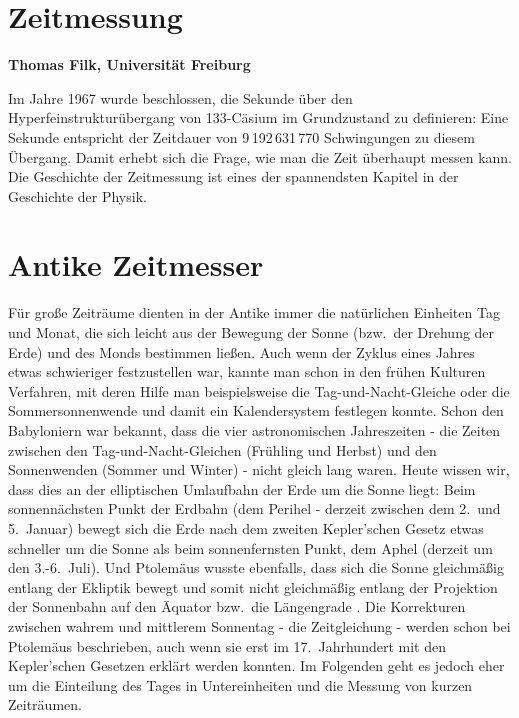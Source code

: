 
\setcounter{page}{1}
\setcounter{section}{0}
\setcounter{figure}{0}
\setcounter{equation}{0}
\setcounter{table}{0}
\setcounter{footnote}{0}

\section*{Zeitmessung}
\vspace{0.2cm}
\noindent
{\bf Thomas Filk, Universit\"at Freiburg}
\vspace{1cm}

\label{chap_Uhren}
\noindent
Im Jahre 1967 wurde beschlossen, die Sekunde \"uber den Hyperfeinstruktur\"ubergang
von 133-C\"asium im Grundzustand zu definieren: Eine Sekunde entspricht der Zeitdauer von
9\,192\,631\,770 Schwingungen zu diesem \"Ubergang. 
Damit erhebt sich die Frage, wie man die Zeit
\"uberhaupt messen kann. Die Geschichte der Zeitmessung ist eines der spannendsten Kapitel
in der Geschichte der Physik. 

\section{Antike Zeitmesser}

F\"ur gro\ss e Zeitr\"aume dienten in der Antike immer die nat\"urlichen
Einheiten Tag und Monat, die sich leicht aus der Bewegung der Sonne (bzw.\ der Drehung der Erde) 
und des Monds bestimmen lie\ss en.
Auch wenn der Zyklus eines Jahres etwas schwieriger festzustellen war, kannte
man schon in den fr\"uhen Kulturen Verfahren, mit deren Hilfe man beispielsweise die Tag-und-Nacht-Gleiche
oder die Sommersonnenwende und damit ein Kalendersystem festlegen konnte. 
Schon den Babyloniern war bekannt, dass die vier astronomischen Jahreszeiten - die Zeiten
zwischen den Tag-und-Nacht-Gleichen (Fr\"uhling und Herbst) und den Sonnenwenden
(Sommer und Winter) - nicht gleich lang waren. Heute wissen wir, dass dies an der
elliptischen Umlaufbahn der Erde um die Sonne liegt: Beim sonnenn\"achsten Punkt der Erdbahn
(dem Perihel - derzeit zwischen dem 2.\ und 5.\ Januar) bewegt sich die Erde nach dem zweiten Kepler'schen
Gesetz etwas schneller um die Sonne als beim sonnen\-fernsten Punkt, dem Aphel (derzeit um den 3.-6.\ Juli).  
Und Ptolem\"aus wusste ebenfalls, dass sich die Sonne gleichm\"a\ss ig entlang der Ekliptik bewegt und somit
nicht gleichm\"a\ss ig entlang der Projektion der Sonnenbahn auf den \"Aquator 
bzw.\ die L\"angengrade \cite{Neugebauer}. Die Korrekturen zwischen
wahrem und mittlerem Sonnentag - die Zeitgleichung - werden schon bei Ptolem\"aus beschrieben, auch wenn
sie erst im 17.\ Jahrhundert mit den Kepler'schen Gesetzen erkl\"art werden konnten.
Im Folgenden geht es jedoch eher um die Einteilung des Tages in Untereinheiten und die Messung
von kurzen Zeitr\"aumen.

